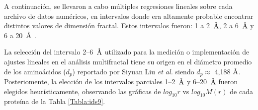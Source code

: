 	A continuaci\'{o}n, se llevaron a cabo m\'{u}ltiples regresiones lineales sobre cada archivo de datos num\'{e}ricos, en intervalos donde era altamente probable encontrar distintos valores de dimensi\'{o}n fractal. Estos intervalos fueron: 1 a 2~$\textup{\r{A}}$, 2 a 6~$\textup{\r{A}}$ y 6 a 20~$\textup{\r{A}}$ \cite{Enright2005, Liu2020}.	
	
	
	
	La selecci\'on del intervalo 2--6~$\textup{\r{A}}$ utilizado para la medici\'on o implementaci\'on de ajustes lineales en el an\'alisis multifractal tiene su origen en el di\'ametro promedio de los amino\'acidos ($d_p$) reportado por Siyuan Liu \textit{et al.}  siendo $d_p \approx$ 4,188 $\textup{\r{A}}$. Posteriomente, la elecci\'{o}n de los intervalos parciales 1--2~$\textup{\r{A}}$ y 6--20~$\textup{\r{A}}$ fueron elegidos heur\'{i}sticamente, observando las gr\'{a}ficas de $log_{10}r$ vs $log_{10}M(r)$ de cada prote\'{i}na de la Tabla \ref{Tabla:ids9}.
	
